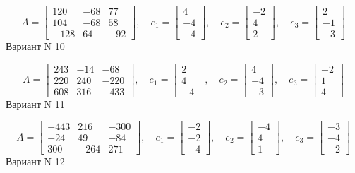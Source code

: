 \documentclass[11pt]{report}
\begin{document}
$$A = \left[\begin{matrix}120 & -68 & 77\\104 & -68 & 58\\-128 & 64 & -92\end{matrix}\right],\quad e_1 = \left[\begin{matrix}4\\-4\\-4\end{matrix}\right],\quad e_2 = \left[\begin{matrix}-2\\4\\2\end{matrix}\right],\quad e_3 = \left[\begin{matrix}2\\-1\\-3\end{matrix}\right]$$Вариант N 10

$$A = \left[\begin{matrix}243 & -14 & -68\\220 & 240 & -220\\608 & 316 & -433\end{matrix}\right],\quad e_1 = \left[\begin{matrix}2\\4\\-4\end{matrix}\right],\quad e_2 = \left[\begin{matrix}4\\-4\\-3\end{matrix}\right],\quad e_3 = \left[\begin{matrix}-2\\1\\4\end{matrix}\right]$$Вариант N 11

$$A = \left[\begin{matrix}-443 & 216 & -300\\-24 & 49 & -84\\300 & -264 & 271\end{matrix}\right],\quad e_1 = \left[\begin{matrix}-2\\-2\\-4\end{matrix}\right],\quad e_2 = \left[\begin{matrix}-4\\4\\1\end{matrix}\right],\quad e_3 = \left[\begin{matrix}-3\\-4\\-2\end{matrix}\right]$$Вариант N 12
\end{document}
